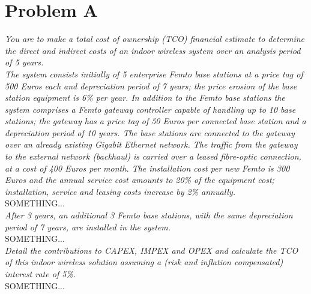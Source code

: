 \section{Problem A}
\textit{You are to make a total cost of ownership (TCO) financial estimate to determine the direct and indirect costs of an indoor wireless system over an analysis period of 5 years.}\\

\textit{The system consists initially of 5 enterprise Femto base stations at a price tag of 500 Euros each and depreciation period of 7 years; the price erosion of the base station equipment is 6\% per year. In addition to the Femto base stations the system comprises a Femto gateway controller capable of handling up to 10 base stations; the gateway has a price tag of 50 Euros per connected base station and a depreciation period of 10 years. The base stations are connected to the gateway over an already existing Gigabit Ethernet network. The traffic from the gateway to the external network (backhaul) is carried over a leased fibre-optic connection, at a cost of 400 Euros per month. The installation cost per new Femto is 300 Euros and the annual service cost amounts to 20\% of the equipment cost; installation, service and leasing costs increase by 2\% annually.}\\

SOMETHING...\\

\textit{After 3 years, an additional 3 Femto base stations, with the same depreciation period of 7 years, are installed in the system.}\\

SOMETHING...\\

\textit{Detail the contributions to CAPEX, IMPEX and OPEX and calculate the TCO of this indoor wireless solution assuming a (risk and inflation compensated) interest rate of 5\%.}\\

SOMETHING...